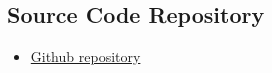 \documentclass[a4paper]{article} %
\begin{document}
\subsection*{Source Code Repository}
\begin{itemize}
    \item \hyperlink{https://github.com/beauwilliams/Comp3100}{Github repository}
\end{itemize}




\end{document}
